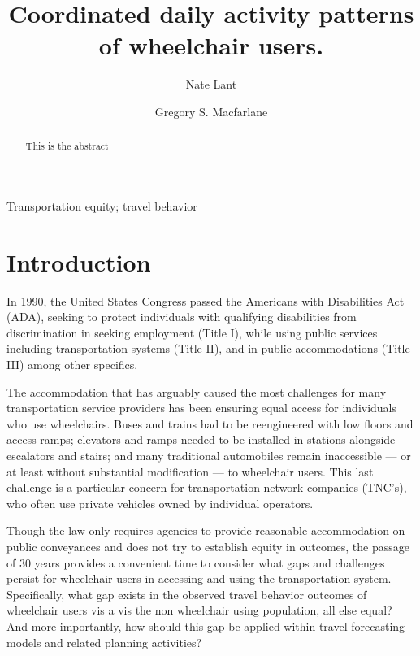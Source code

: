 \documentclass[3p, authoryear, review]{elsarticle} %
\begin{document}
\begin{frontmatter}

  \title{Coordinated daily activity patterns of wheelchair users.}
    \author[BYU]{Nate Lant}
    \author[BYU]{Gregory S. Macfarlane}
      \address[BYU]{Brigham Young University, Civil and Construction Engineering Department, 430 Engineering Building, Provo, Utah 84602}
  
  \begin{abstract}
  This is the abstract
  \end{abstract}
   \begin{keyword} Transportation equity; travel behavior\end{keyword}
 \end{frontmatter}

\hypertarget{intro}{%
\section{Introduction}\label{intro}}

In 1990, the United States Congress passed the Americans with Disabilities Act (ADA),
seeking to protect individuals with qualifying disabilities from discrimination
in seeking employment (Title I), while using public services including
transportation systems (Title II), and in public accommodations (Title III) among
other specifics.

The accommodation that has arguably caused the most challenges
for many transportation service providers has been ensuring equal
access for individuals who use wheelchairs. Buses and trains had to be reengineered
with low floors and access ramps; elevators and ramps needed to be installed
in stations alongside escalators and stairs; and many traditional automobiles
remain inaccessible --- or at least without substantial modification --- to
wheelchair users. This last challenge is a particular concern for transportation
network companies (TNC's), who often use private vehicles owned by individual
operators.

Though the law only requires agencies to provide reasonable accommodation on
public conveyances and
does not try to establish equity in outcomes, the passage of 30 years provides a
convenient time to consider what gaps and challenges persist for wheelchair
users in accessing and using the transportation system. Specifically, what gap
exists in the observed travel behavior outcomes of wheelchair users vis a vis
the non wheelchair using population, all else equal? And more importantly, how
should this gap be applied within travel forecasting models and related planning
activities?
\end{document}
